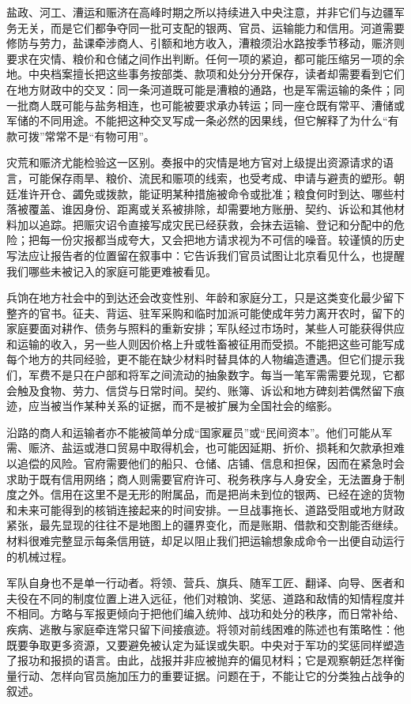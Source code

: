 盐政、河工、漕运和赈济在高峰时期之所以持续进入中央注意，并非它们与边疆军务无关，而是它们都争夺同一批可支配的银两、官员、运输能力和信用。河道需要修防与劳力，盐课牵涉商人、引额和地方收入，漕粮须沿水路按季节移动，赈济则要求在灾情、粮价和仓储之间作出判断。任何一项的紧迫，都可能压缩另一项的余地。中央档案擅长把这些事务按部类、款项和处分分开保存，读者却需要看到它们在地方财政中的交叉：同一条河道既可能是漕粮的通路，也是军需运输的条件；同一批商人既可能与盐务相连，也可能被要求承办转运；同一座仓既有常平、漕储或军储的不同用途。不能把这种交叉写成一条必然的因果线，但它解释了为什么“有款可拨”常常不是“有物可用”。

灾荒和赈济尤能检验这一区别。奏报中的灾情是地方官对上级提出资源请求的语言，可能保存雨旱、粮价、流民和赈项的线索，也受考成、申请与避责的塑形。朝廷准许开仓、蠲免或拨款，能证明某种措施被命令或批准；粮食何时到达、哪些村落被覆盖、谁因身份、距离或关系被排除，却需要地方账册、契约、诉讼和其他材料加以追踪。把赈灾诏令直接写成灾民已经获救，会抹去运输、登记和分配中的危险；把每一份灾报都当成夸大，又会把地方请求视为不可信的噪音。较谨慎的历史写法应让报告者的位置留在叙事中：它告诉我们官员试图让北京看见什么，也提醒我们哪些未被记入的家庭可能更难被看见。

兵饷在地方社会中的到达还会改变性别、年龄和家庭分工，只是这类变化最少留下整齐的官书。征夫、背运、驻军采购和临时加派可能使成年劳力离开农时，留下的家庭要面对耕作、债务与照料的重新安排；军队经过市场时，某些人可能获得供应和运输的收入，另一些人则因价格上升或牲畜被征用而受损。不能把这些可能写成每个地方的共同经验，更不能在缺少材料时替具体的人物编造遭遇。但它们提示我们，军费不是只在户部和将军之间流动的抽象数字。每当一笔军需需要兑现，它都会触及食物、劳力、信贷与日常时间。契约、账簿、诉讼和地方碑刻若偶然留下痕迹，应当被当作某种关系的证据，而不是被扩展为全国社会的缩影。

沿路的商人和运输者亦不能被简单分成“国家雇员”或“民间资本”。他们可能从军需、赈济、盐运或港口贸易中取得机会，也可能因延期、折价、损耗和欠款承担难以追偿的风险。官府需要他们的船只、仓储、店铺、信息和担保，因而在紧急时会求助于既有信用网络；商人则需要官府许可、税务秩序与人身安全，无法置身于制度之外。信用在这里不是无形的附属品，而是把尚未到位的银两、已经在途的货物和未来可能得到的核销连接起来的时间安排。一旦战事拖长、道路受阻或地方财政紧张，最先显现的往往不是地图上的疆界变化，而是账期、借款和交割能否继续。材料很难完整显示每条信用链，却足以阻止我们把运输想象成命令一出便自动运行的机械过程。

军队自身也不是单一行动者。将领、营兵、旗兵、随军工匠、翻译、向导、医者和夫役在不同的制度位置上进入远征，他们对粮饷、奖惩、道路和敌情的知情程度并不相同。方略与军报更倾向于把他们编入统帅、战功和处分的秩序，而日常补给、疾病、逃散与家庭牵连常只留下间接痕迹。将领对前线困难的陈述也有策略性：他既要争取更多资源，又要避免被认定为延误或失职。中央对于军功的奖惩同样塑造了报功和报损的语言。由此，战报并非应被抛弃的偏见材料；它是观察朝廷怎样衡量行动、怎样向官员施加压力的重要证据。问题在于，不能让它的分类独占战争的叙述。


